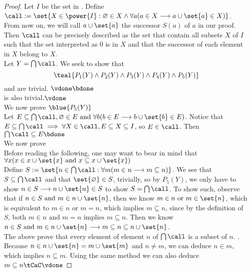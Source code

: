 \documentclass{report}
\begin{document}
\begin{proof}
  Let $I$ be the set in . Define $ \call:=\set{X\in\power{I}:\varnothing \in X \land \forall a(a \in X \longrightarrow a\cup \set{a}\in X)} $. From now on, we will call $a\cup \set{a}$ the successor $S(a)$ of $a$ in our proof.\\

Then  $\call$ can be precisely described as the set that contain all subsets $X$ of  $I$ such that the set interpreted as  $0$ is in  $X$ and that the successor of each element in $X$ belong to  $X$.\\

Let $Y=\bigcap \call$. We seek to show that 
\begin{equation*}
\teal{P_1(Y)\land P_2(Y) \land P_3(Y) \land P_4(Y)\land P_5(Y)}
\end{equation*}
 and  are trivial. $\vdone \bdone$\\

 is also trivial.$\vdone$\\


We now prove $\blue{P_5(Y)}$\\

Let $E \subseteq \bigcap  \call,\varnothing\in E\text{ and }\forall b(b\in E\longrightarrow b \cup \set{b}\in E)$. Notice that $E\subseteq \bigcap \call \implies \forall X\in \call ,E\subseteq X \subseteq I$, so $E\in \call $. Then $\bigcap \call \subseteq E \bdone$\\

We now prove \\

Before reading the following, one may want to bear in mind that $\forall x(x\in x\cup \set{x}\text{ and }x\subseteq x\cup \set{x})$ \\

Define $S:=\set{n\in \bigcap \call:\forall m(m \in n \longrightarrow  m\subseteq n) }$. We see that $S\subseteq \bigcap \call $ and that $\set{\varnothing}\in S$, trivially, so by $P_5(Y)$, we only have to show $n \in S \longrightarrow n\cup \set{n}\in S$ to show $S=\bigcap  \call $. To show such, observe that if $n\in S\text{ and }m \in n \cup \set{n}$, then we know $m \in n\text{ or }m \in \set{n}$, which is equivalent to $m \in n \text{ or } m=n$, which implies $m\subseteq n$, since by the definition of $S$, both  $m \in n\text{ and }m=n$ implies $m\subseteq n$. Then we know $n\in S\text{ and }m \in n \cup \set{n}\longrightarrow  m\subseteq n \subseteq n\cup \set{n}$.\\

The above prove that every element of element $n$ of  $\bigcap \call $ is a subset of $n$. . Because $n\in n \cup  \set{n}=m\cup  \set{m}$ and $n\neq m$, we can deduce $n \in m$, which implies $n\subseteq m$. Using the same method we can also deduce $m \subseteq n\tCaC \vdone$    
\end{proof}
\end{document}
